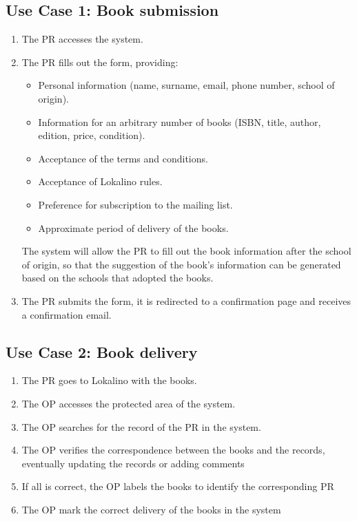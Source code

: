 \subsection{Use Case 1: Book submission}

\begin{enumerate}
    \item The PR accesses the system.
    \item The PR fills out the form, providing:
          \begin{itemize}
              \item Personal information (name, surname, email, phone number, school of origin).
              \item Information for an arbitrary number of books (ISBN, title, author, edition, price, condition).
              \item Acceptance of the terms and conditions.
              \item Acceptance of Lokalino rules.
              \item Preference for subscription to the mailing list.
              \item Approximate period of delivery of the books.
          \end{itemize}
          The system will allow the PR to fill out the book information after the school of origin, so that the suggestion of the book's information can be generated based on the schools that adopted the books.
    \item The PR submits the form, it is redirected to a confirmation page and receives a confirmation email.
\end{enumerate}

\subsection{Use Case 2: Book delivery}

\begin{enumerate}
    \item The PR goes to Lokalino with the books.
    \item The OP accesses the protected area of the system.
    \item The OP searches for the record of the PR in the system.
    \item The OP verifies the correspondence between the books and the records, eventually updating the records or adding comments
    \item If all is correct, the OP labels the books to identify the corresponding PR
    \item The OP mark the correct delivery of the books in the system
\end{enumerate}

